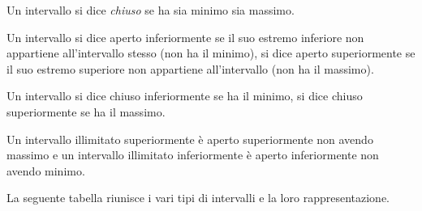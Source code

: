 
\begin{newdef}{}{}
Un intervallo si dice \emph{chiuso} se  ha sia minimo sia massimo.
\end{newdef}


\begin{newdef}{}{}
Un intervallo si dice aperto inferiormente se il suo estremo inferiore non 
appartiene all'intervallo stesso (non ha il minimo), 
si dice aperto superiormente se il suo estremo superiore non appartiene 
all'intervallo (non ha il massimo).
\end{newdef}

\begin{newdef}{}{}
Un intervallo si dice chiuso inferiormente se ha il minimo, 
si dice chiuso superiormente se ha il massimo.
\end{newdef}

Un intervallo illimitato superiormente è aperto superiormente non avendo 
massimo e un intervallo illimitato inferiormente è aperto inferiormente non 
avendo minimo.
% 

La seguente tabella riunisce i vari tipi di intervalli e la loro 
rappresentazione.


